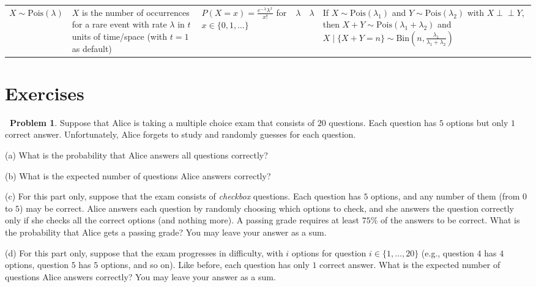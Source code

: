 \documentclass[12pt,oneside]{article}
\newcommand{\indep}{\perp\!\!\!\perp}
\newcommand{\Bin}{\text{Bin}}
\newcommand{\Pois}{\text{Pois}}
\theoremstyle{definition}
\newtheorem{problem}{\faPen \ Problem}
\theoremstyle{remark}
\begin{document}
\begin{center}
{\begin{tabular}{p{2cm}|p{2.5cm}|p{3cm}|p{1.5cm}|p{2.5cm}|p{2.5cm}}
\hline

$X \sim \Pois(\lambda)$
& $X$ is the number of occurrences for a rare event with rate $\lambda$ in $t$ units of time/space (with $t = 1$ as default)
& $P(X = x) = \frac{e^{- \lambda} \lambda^x}{x!}$ for $x \in \{0, 1, \ldots\}$
& $\lambda$
& $\lambda$
& If $X \sim \Pois(\lambda_1)$ and $Y \sim \Pois(\lambda_2)$ with $X \indep Y$, then $X + Y \sim \Pois(\lambda_1 + \lambda_2)$ and $X \mid \{X + Y = n\} \sim \Bin \left( n, \frac{\lambda_1}{\lambda_1 + \lambda_2} \right)$
\end{tabular}
}
\end{center}

\section{Exercises}

\begin{problem}
Suppose that Alice is taking a multiple choice exam that consists of $20$ questions. Each question has $5$ options but only $1$ correct answer. Unfortunately, Alice forgets to study and randomly guesses for each question.

(a) What is the probability that Alice answers all questions correctly?

(b) What is the expected number of questions Alice answers correctly?

(c) For this part only, suppose that the exam consists of \textit{checkbox} questions. Each question has $5$ options, and any number of them (from $0$ to $5$) may be correct. Alice answers each question by randomly choosing which options to check, and she answers the question correctly only if she checks all the correct options (and nothing more). A passing grade requires at least $75\%$ of the answers to be correct. What is the probability that Alice gets a passing grade? You may leave your answer as a sum.

(d) For this part only, suppose that the exam progresses in difficulty, with $i$ options for question $i \in \{1, \ldots, 20\}$ (e.g., question $4$ has $4$ options, question $5$ has $5$ options, and so on). Like before, each question has only $1$ correct answer. What is the expected number of questions Alice answers correctly? You may leave your answer as a sum.
\end{problem}
\end{document}
